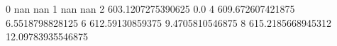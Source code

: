 0 nan nan
1 nan nan
2 603.1207275390625 0.0
4 609.672607421875 6.5518798828125
6 612.59130859375 9.4705810546875
8 615.2185668945312 12.09783935546875
